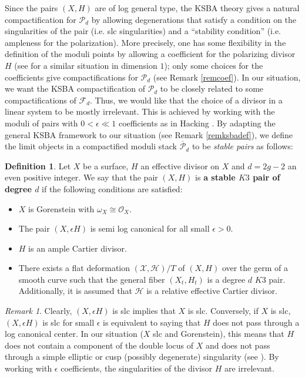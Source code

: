 \documentclass{amsart}
\numberwithin{equation}{section}
\theoremstyle{plain}
\theoremstyle{remark}
\newtheorem{remark}[equation]{Remark}
\theoremstyle{definition}
\newtheorem{definition}[equation]{Definition}
\newcommand{\calF}{\mathcal{F}}
\newcommand{\calH}{\mathcal{H}}
\newcommand{\calO}{\mathcal{O}}
\newcommand{\calP}{\mathcal{P}}
\newcommand{\sX}{\mathscr{X}}
\begin{document}
 Since the pairs $(X,H)$ are of log general type,  the KSBA theory gives a natural compactification for $\calP_d$ by allowing degenerations that satisfy a condition on the singularities of the pair (i.e. slc singularities) and a ``stability condition'' (i.e. ampleness for the polarization). More precisely, one has some flexibility in the definition of the moduli points by allowing a coefficient for the polarizing divisor $H$ (see  \cite{hassettweighted} for a similar situation in dimension $1$); only some choices for the coefficients give compactifications for $\calP_d$ (see Remark \ref{remcoef}). In our situation, we want the KSBA  compactification of $\calP_d$ to  be closely related to some compactifications of $\calF_d$. Thus, we would like that the choice of a divisor in a linear system to be mostly irrelevant. This is achieved by working with the moduli of pairs with $0<\epsilon\ll 1$ coefficients as in  Hacking \cite{hacking}. By adapting the general KSBA framework to our situation (see Remark \ref{remksbadef}), we define the limit objects in a compactified moduli stack $\overline{\calP}_d$ to be {\it stable pairs} as follows:
  \begin{definition}\label{defstable}
Let $X$ be a surface, $H$ an effective divisor on $X$ and $d=2g-2$ an even positive integer. We say that the pair $(X,H)$ is {\bf a stable $K3$ pair of degree $d$} if the following conditions are satisfied:
\begin{itemize}
\item[(0)] $X$ is Gorenstein  with $\omega_X\cong \calO_X$.
\item[(1)] The pair $(X,\epsilon H)$ is semi log canonical for all small $\epsilon >0$.
\item[(2)] $H$ is an ample Cartier divisor.
\item[(3)] There exists a flat deformation $(\sX,\calH)/T$ of $(X,H)$ over the germ of a smooth curve such that the general fiber $(X_t,H_t)$  is a degree $d$ $K3$ pair. Additionally, it is assumed that  $\calH$ is a relative effective Cartier divisor. 
\end{itemize}
\end{definition}

\begin{remark} Clearly, $(X,\epsilon H)$ is slc implies that $X$ is slc. 
Conversely, if $X$ is slc,  $(X,\epsilon H)$ is slc for small $\epsilon$ is equivalent to saying that $H$ does not pass through a log canonical center. In our situation ($X$ slc and Gorenstein),  this means that $H$ does not contain a component of the double locus of $X$ and does not pass through  a simple elliptic or cusp (possibly degenerate) singularity (see \cite[Thm. 4.21]{ksb}).  By working with $\epsilon$ coefficients, the singularities of the divisor $H$ are irrelevant. 
\end{remark}
\end{document}
